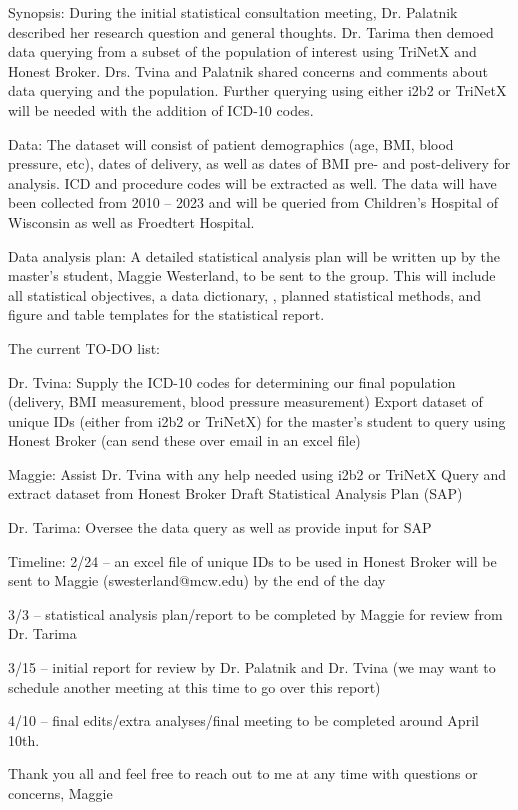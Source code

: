 \documentclass[11pt]{article}
\begin{document}
Synopsis: During the initial statistical consultation meeting, Dr. Palatnik described her research question and general thoughts. Dr. Tarima then demoed data querying from a subset of the population of interest using TriNetX and Honest Broker. Drs. Tvina and Palatnik shared concerns and comments about data querying and the population. Further querying using either i2b2 or TriNetX will be needed with the addition of ICD-10 codes.

Data: The dataset will consist of patient demographics (age, BMI, blood pressure, etc), dates of delivery, as well as dates of BMI pre- and post-delivery for analysis. ICD and procedure codes will be extracted as well. The data will have been collected from 2010 – 2023 and will be queried from Children’s Hospital of Wisconsin as well as Froedtert Hospital.

Data analysis plan: A detailed statistical analysis plan will be written up by the master’s student, Maggie Westerland, to be sent to the group. This will include all statistical objectives, a data dictionary, , planned statistical methods, and figure and table templates for the statistical report.

The current TO-DO list:

Dr. Tvina:
Supply the ICD-10 codes for determining our final population (delivery, BMI measurement, blood pressure measurement)
Export dataset of unique IDs (either from i2b2 or TriNetX) for the master’s student to query using Honest Broker (can send these over email in an excel file)

Maggie:
Assist Dr. Tvina with any help needed using i2b2 or TriNetX
Query and extract dataset from Honest Broker
Draft Statistical Analysis Plan (SAP)

Dr. Tarima:
Oversee the data query as well as provide input for SAP

Timeline: 
2/24 -- an excel file of unique IDs to be used in Honest Broker will be sent to Maggie (swesterland@mcw.edu) by the end of the day

3/3 -- statistical analysis plan/report to be completed by Maggie for review from Dr. Tarima

3/15 -- initial report for review by Dr. Palatnik and Dr. Tvina (we may want to schedule another meeting at this time to go over this report)

4/10 -- final edits/extra analyses/final meeting to be completed around April 10th.


Thank you all and feel free to reach out to me at any time with questions or concerns,
Maggie
\end{document}
